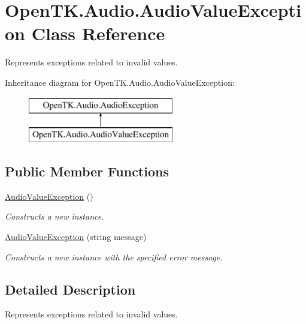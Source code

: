 \hypertarget{class_open_t_k_1_1_audio_1_1_audio_value_exception}{\section{Open\-T\-K.\-Audio.\-Audio\-Value\-Exception Class Reference}
\label{class_open_t_k_1_1_audio_1_1_audio_value_exception}
}


Represents exceptions related to invalid values. 


Inheritance diagram for Open\-T\-K.\-Audio.\-Audio\-Value\-Exception\-:\begin{figure}[H]
\begin{center}
\leavevmode
\includegraphics[height=2.000000cm]{class_open_t_k_1_1_audio_1_1_audio_value_exception}
\end{center}
\end{figure}
\subsection*{Public Member Functions}
\begin{DoxyCompactItemize}
\item 
\hyperlink{class_open_t_k_1_1_audio_1_1_audio_value_exception_a2d22569f928830f426f9bbefcc2def52}{Audio\-Value\-Exception} ()
\begin{DoxyCompactList}\small\item\em Constructs a new instance.\end{DoxyCompactList}\item 
\hyperlink{class_open_t_k_1_1_audio_1_1_audio_value_exception_a7543860824e3b373407dc85628184c37}{Audio\-Value\-Exception} (string message)
\begin{DoxyCompactList}\small\item\em Constructs a new instance with the specified error message.\end{DoxyCompactList}\end{DoxyCompactItemize}


\subsection{Detailed Description}
Represents exceptions related to invalid values.




